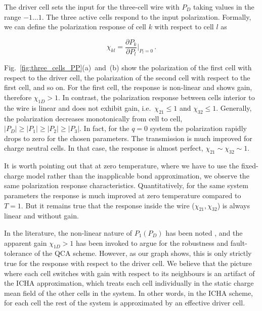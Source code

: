 The driver cell sets the input for the three-cell wire with $P_D$ taking values
in the range $-1 \ldots 1$. The three active cells respond to the input
polarization. Formally, we can define the polarization response of cell $k$ with
respect to cell $l$ as

\begin{equation}
  \chi_{kl} = \frac{\partial P_k}{\partial P_l}\big|_{P_l = 0} \, .
\end{equation}

Fig.~\ref{fig:three_cells_PP}(a)~and~(b) show the polarization of the first cell
with respect to the driver cell, the polarization of the second cell with
respect to the first cell, and so on. For the first cell, the response is
non-linear and shows gain, therefore $\chi_{1D} > 1$. In contrast, the
polarization response between cells interior to the wire is linear and does not
exhibit gain, i.e.\ $\chi_{21} \le 1$ and $\chi_{32} \le 1$. Generally, the
polarization decreases monotonically from cell to cell, $|P_D| \ge |P_1| \ge
|P_2| \ge |P_3|$. In fact, for the $q=0$ system the polarization rapidly drops
to zero for the chosen parameters. The transmission is much improved for charge
neutral cells.  In that case, the response is almost perfect, $\chi_{21} \sim
\chi_{32} \sim 1$.

It is worth pointing out that at zero temperature, where we have to use the
fixed-charge model rather than the inapplicable bond approximation, we observe
the same polarization response characteristics. Quantitatively, for the same
system parameters the response is much improved at zero temperature compared to
$T=1$. But it remains true that the response inside the wire ($\chi_{21},
\chi_{32}$) is always linear and without gain.

In the literature, the non-linear nature of $P_1(P_D)$ has been noted
\cite{lent1993quantum} \cite{lent1993lines}, and the apparent gain $\chi_{1D} >
1$ has been invoked to argue for the robustness and fault-tolerance of the QCA
scheme. However, as our graph shows, this is only strictly true for the response
with respect to the driver cell. We believe that the picture where each cell
switches with gain with respect to its neighbours is an artifact of the ICHA
approximation, which treats each cell individually in the static charge mean
field of the other cells in the system. In other words, in the ICHA scheme, for
each cell the rest of the system is approximated by an effective driver cell.

